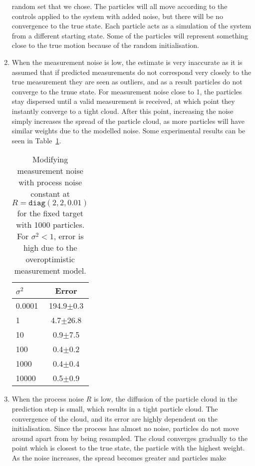\documentclass[a4paper,12pt]{article}
\begin{document}
\begin{enumerate}
  random set that we chose. The particles will all move according to the
  controls applied to the system with added noise, but there will be no
  convergence to the true state. Each particle acts as a simulation of the
  system from a different starting state. Some of the particles will represent
  something close to the true motion because of the random initialisation.
\item When the measurement noise is low, the estimate is very inaccurate as it
  is assumed that if predicted measurements do not correspond very closely to
  the true measurement they are seen as outliers, and as a result particles do
  not converge to the trnue state. For measurement noise close to 1, the
  particles stay dispersed until a valid measurement is received, at which point
  they instantly converge to a tight cloud. After this point, increasing the
  noise simply increases the spread of the particle cloud, as more particles
  will have similar weights due to the modelled noise. Some experimental results
  can be seen in Table~\ref{tab:fixt}.
  \begin{table}
    \centering
    \begin{tabular}{lc}
      $\sigma^2$ & Error         \\\hline
      0.0001 & 194.9$\pm$0.3 \\
      1 & 4.7$\pm$26.8  \\
      10 & 0.9$\pm$7.5   \\
      100 & 0.4$\pm$0.2   \\
      1000 & 0.4$\pm$0.4   \\
      10000 & 0.5$\pm$0.9   \\
    \end{tabular}
    \caption{Modifying measurement noise with process noise constant at
      $R=\texttt{diag}(2,2,0.01)$ for the fixed target with 1000 particles. For $\sigma^2<1$, error
      is high due to the overoptimistic measurement model.}
    \label{tab:fixt}
  \end{table}
\item When the process noise $R$ is low, the diffusion of the particle cloud in
  the prediction step is small, which results in a tight particle cloud. The
  convergence of the cloud, and its error are highly dependent on the
  initialisation. Since the process has almost no noise, particles do not move
  around apart from by being resampled. The cloud converges gradually to the
  point which is closest to the true state, the particle with the highest
  weight. As the noise increases, the spread becomes greater and particles make

\end{enumerate}
\end{document}
